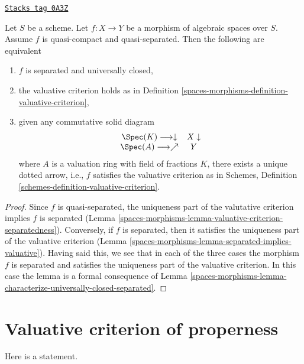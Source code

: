 \begin{lemma}
\label{spaces-morphisms-lemma-characterize-separated-and-universally-closed}
\href{https://stacks.math.columbia.edu/tag/0A3Z}{\texttt{Stacks tag 0A3Z}}

Let $S$ be a scheme. Let $f : X \to Y$ be a morphism of algebraic spaces
over $S$. Assume $f$ is quasi-compact and quasi-separated. Then the
following are equivalent
\begin{enumerate}
\item $f$ is separated and universally closed,
\item the valuative criterion holds as in Definition
\ref{spaces-morphisms-definition-valuative-criterion},
\item given any commutative solid diagram
$$
\begin{array}{cc}\Spec(K) \longrightarrow\downarrow & X \downarrow \\ \Spec(A) \longrightarrow\nearrow & Y\end{array}
$$
where $A$ is a valuation ring with field of fractions $K$, there exists
a unique dotted arrow, i.e., $f$ satisfies the valuative
criterion as in
Schemes, Definition \ref{schemes-definition-valuative-criterion}.
\end{enumerate}
\end{lemma}

\begin{proof}
Since $f$ is quasi-separated, the uniqueness
part of the valutative criterion implies $f$ is separated
(Lemma \ref{spaces-morphisms-lemma-valuative-criterion-separatedness}).
Conversely, if $f$ is separated, then it satisfies the
uniqueness part of the valuative criterion
(Lemma \ref{spaces-morphisms-lemma-separated-implies-valuative}).
Having said this, we see that in each of the three cases the
morphism $f$ is separated and satisfies the uniqueness part
of the valuative criterion. In this case the lemma is a formal
consequence of
Lemma \ref{spaces-morphisms-lemma-characterize-universally-closed-separated}.
\end{proof}

\section{Valuative criterion of properness}
\label{spaces-morphisms-section-valuative-criterion-properness}
Here is a statement.

